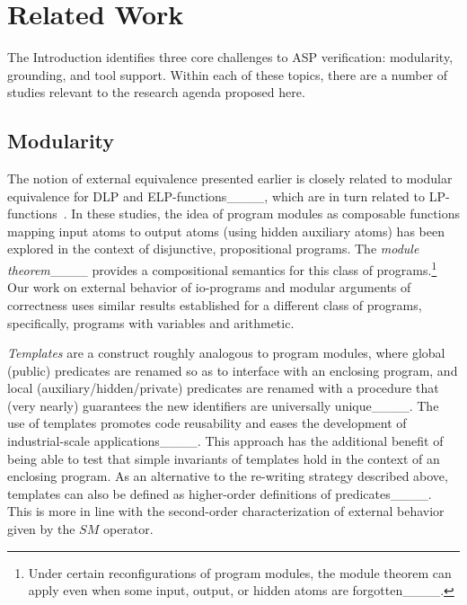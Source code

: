 \section{Related Work}
The Introduction identifies three core challenges to ASP verification: modularity, grounding, and tool support.
%
Within each of these topics, there are a number of studies relevant to the research agenda proposed here.



\subsection{Modularity}

The notion of external equivalence presented earlier is closely related to modular equivalence for DLP and ELP-functions____, which are in turn related to LP-functions~\cite[Section~2]{gel02}.
%
In these studies, the idea of program modules as composable functions mapping input atoms to output atoms (using hidden auxiliary atoms) has been explored in the context of disjunctive, propositional programs.
%
The \emph{module theorem}____ provides a compositional semantics for this class of programs.\footnote{Under certain reconfigurations of program modules, the module theorem can apply even when some input, output, or hidden atoms are forgotten____.}
%
Our work on external behavior of io-programs and modular arguments of correctness uses similar results established for a different class of programs, specifically, programs with variables and arithmetic.

\emph{Templates} are a construct roughly analogous to program modules, where global (public) predicates are renamed so as to interface with an enclosing program, and local (auxiliary/hidden/private) predicates are renamed with a procedure that (very nearly) guarantees the new identifiers are universally unique____.
%
The use of templates promotes code reusability and eases the development of industrial-scale applications____.
%
This approach has the additional benefit of being able to test that simple invariants of templates hold in the context of an enclosing program.
%
As an alternative to the re-writing strategy described above, templates can also be defined as higher-order definitions of predicates____.
%
This is more in line with the second-order characterization of external behavior given by the $SM$ operator.
%


